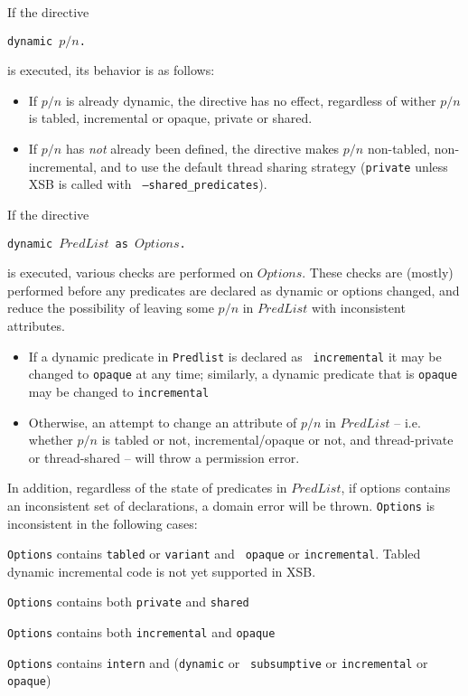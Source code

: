 \begin{description}
If the directive 

{\tt  dynamic $p/n$.}

is executed, its behavior is as follows:
\begin{itemize}
\item If $p/n$ is already dynamic, the directive has no effect,
  regardless of wither $p/n$ is tabled, incremental or opaque, private
  or shared.
%
\item If $p/n$ has {\em not} already been defined, the directive makes
  $p/n$ non-tabled, non-incremental, and to use the default thread
  sharing strategy ({\tt private} unless XSB is called with {\tt
    --shared\_predicates}).
\end{itemize}

If the directive 

{\tt  dynamic $PredList$ as $Options$.}

is executed, various checks are performed on $Options$.  These checks
are (mostly) performed before any predicates are declared as dynamic
or options changed, and reduce the possibility of leaving some $p/n$
in $PredList$ with inconsistent attributes.
%
\begin{itemize}
\item If a dynamic predicate in {\tt Predlist} is declared as {\tt
  incremental} it may be changed to {\tt opaque} at any time;
  similarly, a dynamic predicate that is {\tt opaque} may be changed
  to {\tt incremental}
%
\item Otherwise, an attempt to change an attribute of $p/n$ in
  $PredList$ -- i.e. whether $p/n$ is tabled or not,
  incremental/opaque or not, and thread-private or thread-shared --
  will throw a permission error.
\end{itemize}

In addition, regardless of the state of predicates in $PredList$, if
options contains an inconsistent set of declarations, a domain error
will be thrown.  {\tt Options} is inconsistent in the following cases:
%
\bi
\item {\tt Options} contains {\tt tabled} or {\tt variant} and {\tt
  opaque} or {\tt incremental}.  Tabled dynamic incremental code is
  not yet supported in XSB.
%
\item {\tt Options} contains both {\tt private} and {\tt shared}
%
\item {\tt Options} contains both {\tt incremental} and {\tt opaque}
\item {\tt Options} contains {\tt intern} and ({\tt dynamic} or {\tt
subsumptive} or {\tt incremental} or {\tt opaque})
\ei


\end{description}
